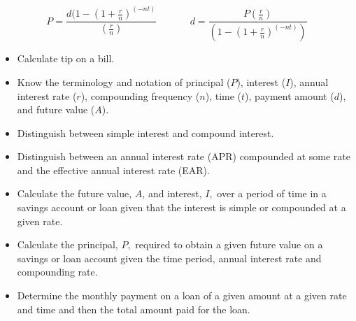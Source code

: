 \documentclass[12pt]{article}
\begin{document}
\begin{enumerate}
$$ P=\frac{d(1-\left(1+\frac{r}{n}\right)^{(-nt)}}{\left(\frac{r}{n} \right)} \hspace{1cm} \quad d= \frac{P\left(\frac{r}{n} \right)}{\left( 1- \left(1+\frac{r}{n}\right)^{(-nt)}\right)}$$
	\begin{itemize}
	\item Calculate tip on a bill.
	\item Know the terminology and notation of principal ($P$), interest ($I$), annual interest rate ($r$), compounding frequency ($n$), time ($t$), payment amount ($d$), and future value ($A$).
	\item Distinguish between simple interest and compound interest.
	\item Distinguish between an annual interest rate (APR) compounded at some rate and the effective annual interest rate (EAR).
	\item Calculate the future value, $A$, and interest, $I,$ over a period of time in a savings account or loan given that the interest is simple or compounded at a given rate.
	\item Calculate the principal, $P,$ required to obtain a given future value on a savings or loan account given the time period, annual interest rate and compounding rate.
	\item Determine the monthly payment on a loan of a given amount at a given rate and time and then the total amount paid for the loan.
	\end{itemize}
\end{enumerate}
\newpage
\end{document}
